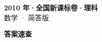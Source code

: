 \documentclass[zihao=-4, a4paper]{ctexart}
\begin{document}
\begin{center}
  {\Large\bfseries 2010 年·全国新课标卷·理科}\\[4pt]
  {\large 数学 · 简答版}
\end{center}
\medskip
{}

\clearpage
{}
\begin{center}{\Large\bfseries 答案速查}\end{center}
\medskip

\end{document}
